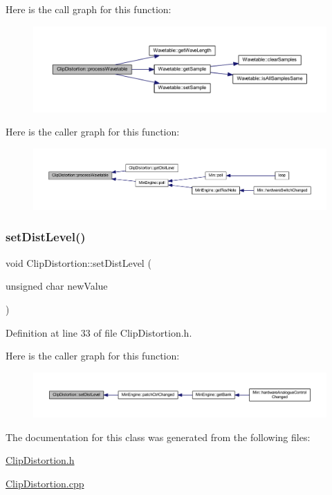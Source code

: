 Here is the call graph for this function\+:
\nopagebreak
\begin{figure}[H]
\begin{center}
\leavevmode
\includegraphics[width=350pt]{class_clip_distortion_a761af22fbd15eb8bcc9ac0fdfe4d655d_cgraph}
\end{center}
\end{figure}
Here is the caller graph for this function\+:
\nopagebreak
\begin{figure}[H]
\begin{center}
\leavevmode
\includegraphics[width=350pt]{class_clip_distortion_a761af22fbd15eb8bcc9ac0fdfe4d655d_icgraph}
\end{center}
\end{figure}
\mbox{\label{class_clip_distortion_a1fe19163beb22de83c8adff0e6447bc8}} 
\subsubsection{\texorpdfstring{set\+Dist\+Level()}{setDistLevel()}}
{\footnotesize\ttfamily void Clip\+Distortion\+::set\+Dist\+Level (\begin{DoxyParamCaption}\item[{unsigned char}]{new\+Value }\end{DoxyParamCaption})\hspace{0.3cm}{\ttfamily [inline]}}



Definition at line 33 of file Clip\+Distortion.\+h.

Here is the caller graph for this function\+:
\nopagebreak
\begin{figure}[H]
\begin{center}
\leavevmode
\includegraphics[width=350pt]{class_clip_distortion_a1fe19163beb22de83c8adff0e6447bc8_icgraph}
\end{center}
\end{figure}


The documentation for this class was generated from the following files\+:\begin{DoxyCompactItemize}
\item 
\hyperlink{_clip_distortion_8h}{Clip\+Distortion.\+h}\item 
\hyperlink{_clip_distortion_8cpp}{Clip\+Distortion.\+cpp}\end{DoxyCompactItemize}
